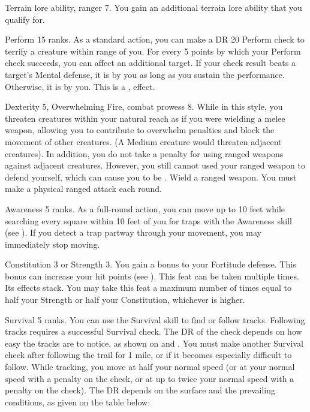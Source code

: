 \featpres Terrain lore ability, ranger 7.
\featben You gain an additional terrain lore ability that you qualify for.

\featpre Perform 15 ranks.
\featben As a standard action, you can make a DR 20 Perform check to terrify a creature within \rngmed range of you.
For every 5 points by which your Perform check succeeds, you can affect an additional target.
If your check result beats a target's Mental defense, it is \frightened by you as long as you sustain the performance.
Otherwise, it is \shaken by you.
This is a ,  effect.

\featpres Dexterity 5, Overwhelming Fire, combat prowess 8.
\featben While in this style, you threaten creatures within your natural reach as if you were wielding a melee weapon, allowing you to contribute to overwhelm penalties and block the movement of other creatures.
(A Medium creature would threaten adjacent creatures).
In addition, you do not take a  penalty for using ranged weapons against adjacent creatures.
However, you still cannot used your ranged weapon to defend yourself, which can cause you to be .
\stylereq Wield a ranged weapon.
You must make a physical ranged attack each round.

\featpre Awareness 5 ranks.
\featben As a full-round action, you can move up to 10 feet while searching every square within 10 feet of you for traps with the Awareness skill (see ).
If you detect a trap partway through your movement, you may immediately stop moving.

\featpre Constitution 3 or Strength 3.
\featben You gain a  bonus to your Fortitude defense.
This bonus can increase your hit points (see ).
 This feat can be taken multiple times. Its effects stack.
You may take this feat a maximum number of times equal to half your Strength or half your Constitution, whichever is higher.

\featpre Survival 5 ranks.
\featben You can use the Survival skill to find or follow tracks.
Following tracks requires a successful Survival check.
The DR of the check depends on how easy the tracks are to notice, as shown on  and .
You must make another Survival check after following the trail for 1 mile, or if it becomes especially difficult to follow.
While tracking, you move at half your normal speed (or at your normal speed with a  penalty on the check, or at up to twice your normal speed with a  penalty on the check).
The DR depends on the surface and the prevailing conditions, as given on the table below:

